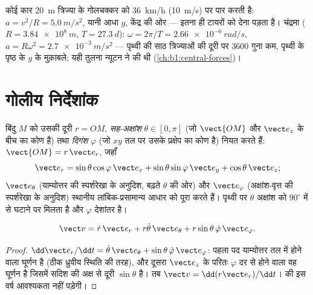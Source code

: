 \begin{example}[दो वृत्त]\label{ex:b1:point-kinematics:circles}
कोई कार \qty{20}{m} त्रिज्या के गोलचक्कर को \qty{36}{km/h}
(\qty{10}{m/s}) पर पार करती है: $a = v^2/R = \qty{5.0}{m/s^2}$, यानी आधा
$g$, केंद्र की ओर --- इतना ही टायरों को देना पड़ता है। चंद्रमा
($R = \qty{3.84e8}{m}$, $T = \qty{27.3}{d}$): $\omega = 2\pi/T =
\qty{2.66e-6}{rad/s}$, $a = R\omega^2 = \qty{2.7e-3}{m/s^2}$ --- पृथ्वी की
साठ त्रिज्याओं की दूरी पर $3600$ गुना कम, पृथ्वी के पृष्ठ के $g$ के
मुक़ाबले; यही तुलना न्यूटन ने की थी (\cref{ch:b1:central-forces})।
\end{example}

\section{गोलीय निर्देशांक}

\begin{definition}[गोलीय निर्देशांक]\label{def:b1:point-kinematics:spherical}
बिंदु $M$ को उसकी दूरी $r = OM$, \emph{सह-अक्षांश}
$\theta \in [0, \pi]$ (जो $\vect{OM}$ और $\vect e_z$ के बीच का कोण है) तथा
\emph{दिगंश} $\varphi$ (जो $xy$ तल पर उसके प्रक्षेप का कोण है) नियत करते हैं:
$\vect{OM} = r\,\vect e_r$, जहाँ
\[
\vect e_r = \sin\theta\cos\varphi\,\vect e_x + \sin\theta\sin\varphi\,\vect e_y + \cos\theta\,\vect e_z ;
\]
$\vect e_\theta$ (याम्योत्तर की स्पर्शरेखा के अनुदिश, बढ़ते $\theta$ की ओर)
और $\vect e_\varphi$ (अक्षांश-वृत्त की स्पर्शरेखा के अनुदिश) स्थानीय
लांबिक-प्रसामान्य आधार को पूरा करते हैं। पृथ्वी पर $\theta$ अक्षांश को
$90^\circ$ में से घटाने पर मिलता है और $\varphi$ देशांतर है।
\end{definition}

\begin{proposition}[गोलीय निर्देशांकों में वेग]\label{prop:b1:point-kinematics:sphericalv}
\[
\vect v = \dot r\,\vect e_r + r\dot\theta\,\vect e_\theta + r\sin\theta\,\dot\varphi\,\vect e_\varphi .
\]
\end{proposition}

\begin{proof}
$\dd\vect e_r/\dd t = \dot\theta\,\vect e_\theta + \sin\theta\,\dot\varphi\,
\vect e_\varphi$: पहला पद याम्योत्तर तल में होने वाला घूर्णन है (ठीक ध्रुवीय
स्थिति की तरह), और दूसरा $\vect e_z$ के परितः $\dot\varphi$ दर से होने वाला
वह घूर्णन है जिसमें सदिश की अक्ष से दूरी $\sin\theta$ है। तब
$\vect v = \dd(r\vect e_r)/\dd t$।  की इस वर्ष आवश्यकता नहीं पड़ेगी।
\end{proof}

